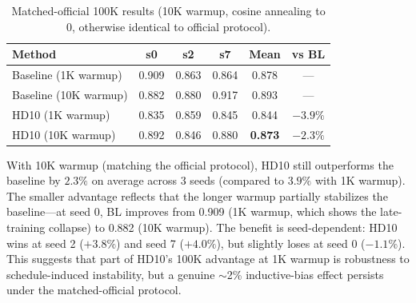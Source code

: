 \documentclass[11pt]{article}
\begin{document}
\begin{table}[h]
\centering
\caption{Matched-official 100K results (10K warmup, cosine annealing to 0, otherwise identical to official protocol).}
\label{tab:matched_official}
\small
\begin{tabular}{lccccc}
\toprule
\textbf{Method} & \textbf{s0} & \textbf{s2} & \textbf{s7} & \textbf{Mean} & \textbf{vs BL} \\
\midrule
Baseline (1K warmup) & 0.909 & 0.863 & 0.864 & 0.878 & --- \\
Baseline (10K warmup) & 0.882 & 0.880 & 0.917 & 0.893 & --- \\
\midrule
HD10 (1K warmup) & 0.835 & 0.859 & 0.845 & 0.844 & $-3.9\%$ \\
HD10 (10K warmup) & 0.892 & 0.846 & 0.880 & \textbf{0.873} & $\mathbf{-2.3\%}$ \\
\bottomrule
\end{tabular}
\end{table}

With 10K warmup (matching the official protocol), HD10 still outperforms the baseline by $2.3\%$ on average across 3 seeds (compared to $3.9\%$ with 1K warmup). The smaller advantage reflects that the longer warmup partially stabilizes the baseline---at seed 0, BL improves from 0.909 (1K warmup, which shows the late-training collapse) to 0.882 (10K warmup). The benefit is seed-dependent: HD10 wins at seed 2 ($+3.8\%$) and seed 7 ($+4.0\%$), but slightly loses at seed 0 ($-1.1\%$). This suggests that part of HD10's 100K advantage at 1K warmup is robustness to schedule-induced instability, but a genuine $\sim$2\% inductive-bias effect persists under the matched-official protocol.
\end{document}

